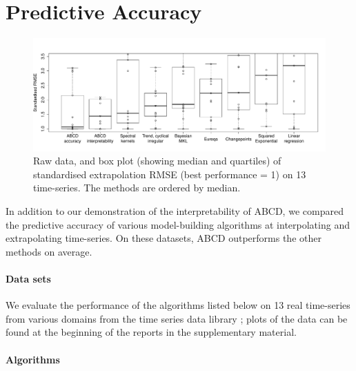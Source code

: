 \documentclass[letterpaper]{article}
\def\eg{e.g.\ }
\newcommand{\procedurename}{ABCD}
\renewcommand{\fTBD}[1]{}
\renewcommand{\NA}[1]{#1}  %
\begin{document}
\section{Predictive Accuracy}
\label{sec:numerical}

\begin{figure}[ht]
\centering
\includegraphics[width=\textwidth]{figures/box_extrap_wide}
\vspace{-0.8cm}
\caption{
Raw data, and box plot (showing median and quartiles) of standardised extrapolation RMSE (best performance = 1) on 13 time-series.
The methods are ordered by median.
}
\label{fig:box_extrap_dist}
\end{figure}

In addition to our demonstration of the interpretability of \procedurename{}, we compared the predictive accuracy of various model-building algorithms at interpolating and extrapolating time-series.
On these datasets, \procedurename{} outperforms the other methods on average.%

\paragraph{Data sets}

We evaluate the performance of the algorithms listed below on 13 real time-series from various domains from the time series data library \citep{TSDL}; plots of the data can be found at the beginning of the reports in the supplementary material.

\paragraph{Algorithms}
\end{document}
